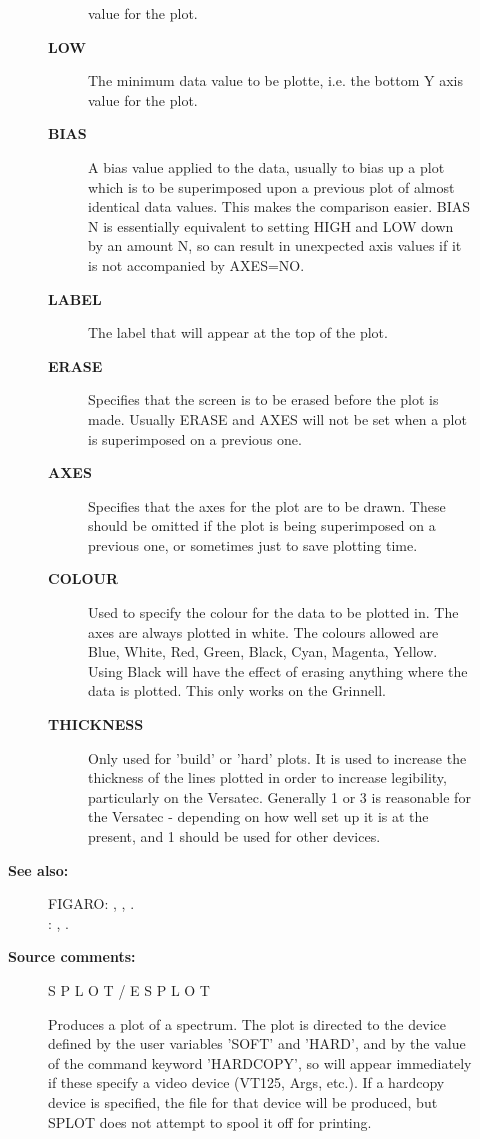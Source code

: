 \begin{description}
\begin{description}
\begin{description}
 value for the plot.
\item [\textbf{LOW}]
 The minimum data value to be plotte, i.e. the bottom Y axis
 value for the plot.
\item [\textbf{BIAS}]
 A bias value applied to the data, usually to bias up a plot
 which is to be superimposed upon a previous plot of almost
 identical data values.  This makes the comparison easier.
 BIAS N  is essentially equivalent to setting HIGH and LOW
 down by an amount N, so can result in unexpected axis values
 if it is not accompanied by AXES=NO.
\item [\textbf{LABEL}]
 The label that will appear at the top of the plot.
\item [\textbf{ERASE}]
 Specifies that the screen is to be erased before the
 plot is made.  Usually ERASE and AXES will not be set
 when a plot is superimposed on a previous one.
\item [\textbf{AXES}]
 Specifies that the axes for the plot are to be drawn.
 These should be omitted if the plot is being superimposed
 on a previous one, or sometimes just to save plotting time.
\item [\textbf{COLOUR}]
 Used to specify the colour for the data to be plotted in.
 The axes are always plotted in white.  The colours allowed
 are Blue, White, Red, Green, Black, Cyan, Magenta, Yellow.
 Using Black will have the effect of erasing anything where
 the data is plotted.  This only works on the Grinnell.
\item [\textbf{THICKNESS}]
 Only used for 'build' or 'hard' plots.  It is used to
 increase the thickness of the lines plotted in order to
 increase legibility, particularly on the Versatec. Generally
 1 or 3 is reasonable for the Versatec - depending on how well
 set up it is at the present, and 1 should be used for other
 devices.
\end{description}

\item [\textbf{See also:}]
FIGARO: , , .\\
: , .\\

\item [\textbf{Source comments:}]
\begin{terminalv}
 S P L O T    /    E S P L O T

 Produces a plot of a spectrum.  The plot is directed
 to the device defined by the user variables 'SOFT' and
 'HARD', and by the value of the command keyword 'HARDCOPY',
 so will appear immediately if these specify a video
 device (VT125, Args, etc.).  If a hardcopy device
 is specified, the file for that device will be produced,
 but SPLOT does not attempt to spool it off for printing.


\end{terminalv}
\end{description}
\end{description}
